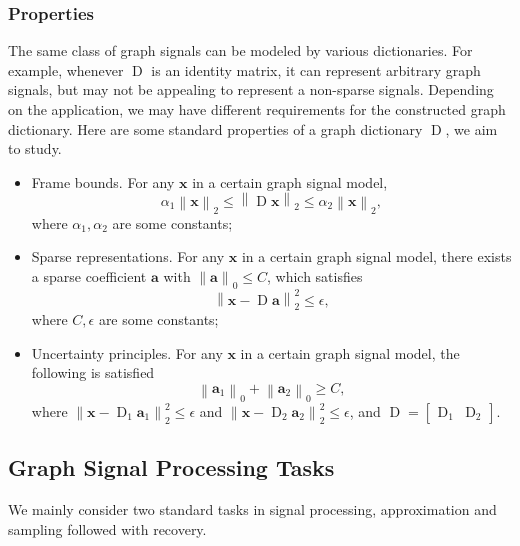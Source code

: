\documentclass[journal,twocolumn,10pt]{IEEEtran}
\theoremstyle{definition}
\def\a{\mathbf{a}}
\def\x{\mathbf{x}}
\DeclareMathOperator{\D}{D}
\begin{document}
\subsubsection{Properties}
\label{sec:properties}
The same class of graph signals can be modeled by various dictionaries. For example, whenever $\D$ is an identity matrix, it can represent arbitrary graph signals, but may not be appealing to represent a non-sparse signals. Depending on the application, we may have different requirements for the constructed graph dictionary. Here are some standard properties of a graph dictionary $\D$, we aim to study.
\begin{itemize}
\item Frame bounds. For any $\x$ in  a certain graph signal model,
\begin{equation*}
\alpha_1  \left\|  \x  \right\|_2 \leq  \left\| \D \x  \right\|_2 \leq  \alpha_2 \left\| \x  \right\|_2,
\end{equation*}
where $\alpha_1, \alpha_2$ are some constants;

\item Sparse representations. For any $\x$ in a certain graph signal model, there exists a sparse coefficient $\a$ with $\left\| \a \right\|_0 \leq C$, which satisfies 
\begin{equation*}
\left\| \x - \D \a \right\|_2^2  \leq \epsilon,
\end{equation*}
where $C, \epsilon$ are some constants;

\item Uncertainty principles. For  any $\x$ in a certain graph signal model,  the following is satisfied 
\begin{equation*}
\left\| \a_1 \right\|_0 + \left\| \a_2 \right\|_0   \geq C,
\end{equation*}
where $\left\| \x - \D_1 \a_1 \right\|_2^2  \leq \epsilon$ and
$\left\| \x - \D_2 \a_2 \right\|_2^2 \leq \epsilon$, and $\D = \begin{bmatrix}
\D_1 & \D_2
\end{bmatrix}$.
\end{itemize}

\subsection{Graph Signal Processing Tasks}
\label{sec:template_tasks}
We mainly consider two standard tasks in signal processing, approximation and sampling followed with recovery.
\end{document}
